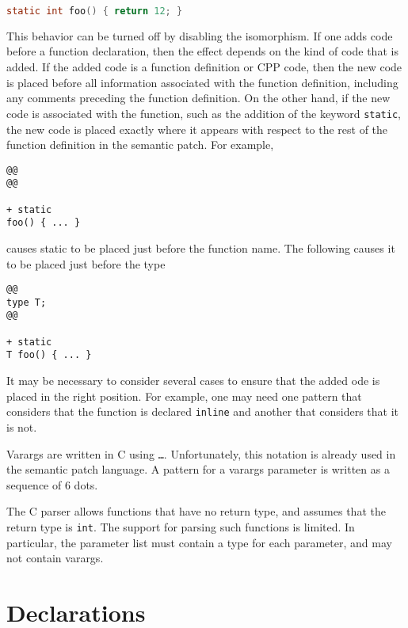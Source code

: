 \begin{lstlisting}[language=C]
static int foo() { return 12; }
\end{lstlisting}

\noindent
This behavior can be turned off by disabling the 
isomorphism.  If one adds code before a function declaration, then the
effect depends on the kind of code that is added.  If the added code is a
function definition or CPP code, then the new code is placed before
all information associated with the function definition, including any
comments preceding the function definition.  On the other hand, if the new
code is associated with the function, such as the addition of the keyword
{\tt static}, the new code is placed exactly where it appears with respect
to the rest of the function definition in the semantic patch.  For example,

\begin{lstlisting}[language=Cocci]
@@
@@

+ static
foo() { ... }
\end{lstlisting}

\noindent
causes static to be placed just before the function name.  The following
causes it to be placed just before the type

\begin{lstlisting}[language=Cocci]
@@
type T;
@@

+ static
T foo() { ... }
\end{lstlisting}

\noindent
It may be necessary to consider several cases to ensure that the added ode
is placed in the right position.  For example, one may need one pattern
that considers that the function is declared {\tt inline} and another that
considers that it is not.

Varargs are written in C using {\tt \ldots}.  Unfortunately, this notation
is already used in the semantic patch language.  A pattern for a varargs
parameter is written as a sequence of 6 dots.

The C parser allows functions that have no return type, and assumes that
the return type is \texttt{int}.  The support for parsing such functions is
limited.  In particular, the parameter list must contain a type for each
parameter, and may not contain varargs.


\section{Declarations}


